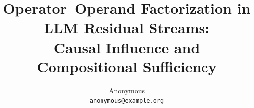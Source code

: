\documentclass[11pt]{article}
\title{Operator--Operand Factorization in LLM Residual Streams:\\Causal Influence and Compositional Sufficiency}
\author{Anonymous \\ \texttt{anonymous@example.org}}
\begin{document}
\maketitle

\begin{abstract}

\end{abstract}




\onecolumn  %
\appendix

\end{document}
